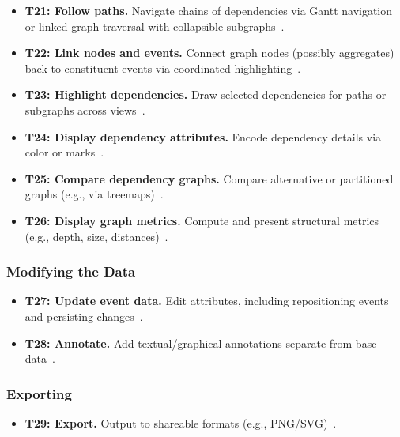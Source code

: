 \begin{refsection}
\begin{itemize}
\item \textbf{T21: Follow paths.} Navigate chains of dependencies via Gantt navigation~\cite{haugen2015visualizing, hirakata2022exploring} or linked graph traversal with collapsible subgraphs~\cite{de2010zinsight, sakin2022traveler, adhianto2010hpctoolkit}. 

\item \textbf{T22: Link nodes and events.} Connect graph nodes (possibly aggregates) back to constituent events via coordinated highlighting~\cite{de2010zinsight, sakin2022traveler}. 

\item \textbf{T23: Highlight dependencies.} Draw selected dependencies for paths or subgraphs across views~\cite{sakin2022traveler, schnorr2010triva, isaacs2014combing, haugen2015visualizing, tory2013comparative, dkabrowski2024manufacturing}. 

\item \textbf{T24: Display dependency attributes.} Encode dependency details via color or marks~\cite{koike1997visualinda, drebes2014aftermath, de2010zinsight, isaacs2014combing, antweiler2022uncovering, dkabrowski2024manufacturing}. 

\item \textbf{T25: Compare dependency graphs.} Compare alternative or partitioned graphs (e.g., via treemaps)~\cite{sun2021daisen}. 

\item \textbf{T26: Display graph metrics.} Compute and present structural metrics (e.g., depth, size, distances)~\cite{adhianto2010hpctoolkit, schnorr2010triva, tory2013comparative}.
\end{itemize}

\subsubsection{Modifying the Data}

\begin{itemize}\itemsep0.25ex
\item \textbf{T27: Update event data.} Edit attributes, including repositioning events and persisting changes~\cite{jo2014livegantt, bell2003paraprof}.

\item \textbf{T28: Annotate.} Add textual/graphical annotations separate from base data~\cite{drebes2014aftermath, gupta2016movementslicer}.
\end{itemize}

\subsubsection{Exporting}
\begin{itemize}\itemsep0.25ex
\item \textbf{T29: Export.} Output to shareable formats (e.g., PNG/SVG)~\cite{drebes2014aftermath, zaki1999toward, pillet1995paraver, sakin2022traveler}.
\end{itemize}


\end{refsection}
